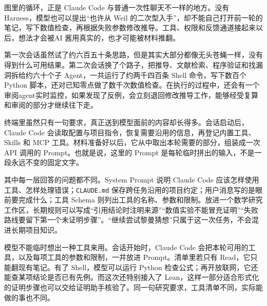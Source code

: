 图里的循环，正是 Claude Code 与普通一次性聊天不一样的地方。没有 Harness，模型也可以提出“也许从 Weil 的二次型入手”，却不能自己打开前一轮的笔记，写下数值检查，再根据失败参数修改推导。工具、权限和反馈通道接起来以后，想法才会被AI 酱用真实的，也才可能被材料推翻。

第一次会话虽然试了约六百五十条思路，但是其实大部分都像无头苍蝇一样，没有得到什么可用结果。第二次会话换了个路子，把推导、文献检索、程序验证和找漏洞拆给约六十个子 Agent，一共运行了约两千四百条 Shell 命令，写下数百个 Python 脚本，还对已知零点做了数千次数值检查。在执行的过程中，还会有一个审阅agent实时监控，如果发现了反例，会立刻退回修改推导工作，能够经受复算和审阅的部分才继续往下走。\cite{ch03riemannweb}

\FloatBarrier

终端里虽然只有一句要求，真正送到模型面前的内容却长得多。会话启动后，Claude Code 会读取配置与项目指令，恢复需要沿用的信息，再登记内置工具、Skills 和 MCP 工具。材料准备好以后，它从中取出本轮需要的部分，组装成一次 API 调用的 Prompt。也就是说，这里的 Prompt 是每轮临时拼出的输入，不是一段永远不变的固定文字。\cite{ch03inside}

其中每一层回答的问题都不同。System Prompt 说明 Claude Code 应该怎样使用工具、怎样处理错误；\texttt{CLAUDE.md} 保存跨任务沿用的项目约定；用户消息写的是眼前要完成什么；工具 Schema 则列出工具的名称、参数和限制。放进一个数学研究工作区，长期规则可以写成“引用结论时注明来源”“数值实验不能冒充证明”“失败路线要留下第一个未证明步骤”。“继续尝试黎曼猜想”只属于这一次任务，不会混进长期项目知识。

模型不能临时想出一种工具来用。会话开始时，Claude Code 会把本轮可用的工具，以及每项工具的参数和限制，一并放进 Prompt。清单里若只有 Read，它只能翻现有笔记。有了 Shell，模型可以运行 Python 检查公式；再开放联网，它还能查某项结论是否已有先例。而这次还特别接入了 Lean，这样一部分适合形式化的证明步骤也可以交给证明助手核验了。同一句研究要求，工具清单不同，实际能做的事也不同。

